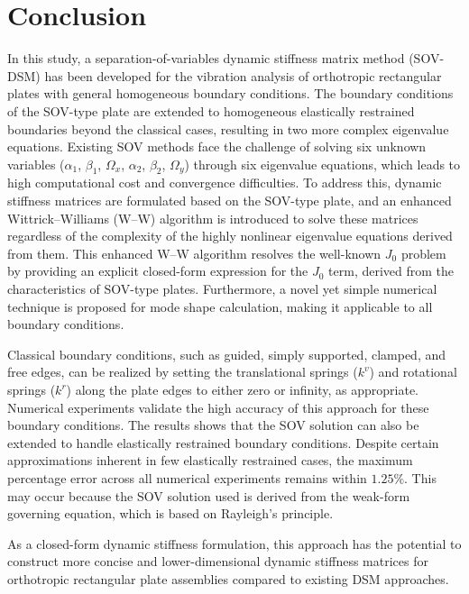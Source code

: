 \documentclass[preprint,12pt,number]{elsarticle}
\begin{document}
\section{Conclusion}\label{sec:coclusion}
In this study, a separation-of-variables dynamic stiffness matrix method (SOV-DSM) has been developed for the vibration analysis of orthotropic rectangular plates with general homogeneous boundary conditions. 
The boundary conditions of the SOV-type plate are extended to homogeneous elastically restrained boundaries beyond the classical cases, resulting in two more complex eigenvalue equations. 
Existing SOV methods face the challenge of solving six unknown variables ($\alpha_1$, $\beta_1$, $\Omega_x$, $\alpha_2$, $\beta_2$, $\Omega_y$) through six eigenvalue equations, which leads to high computational cost and convergence difficulties. 
To address this, dynamic stiffness matrices are formulated based on the SOV-type plate, and an enhanced Wittrick–Williams (W–W) algorithm is introduced to solve these matrices regardless of the complexity of the highly nonlinear eigenvalue equations derived from them. 
This enhanced W–W algorithm resolves the well-known $J_0$ problem by providing an explicit closed-form expression for the $J_0$ term, derived from the characteristics of SOV-type plates. 
Furthermore, a novel yet simple numerical technique is proposed for mode shape calculation, making it applicable to all boundary conditions.

Classical boundary conditions, such as guided, simply supported, clamped, and free edges, can be realized by setting the translational springs ($k^v$) and rotational springs ($k^r$) along the plate edges to either zero or infinity, as appropriate.  
Numerical experiments validate the high accuracy of this approach for these boundary conditions.  
The results shows that the SOV solution can also be extended to handle elastically restrained boundary conditions.
Despite certain approximations inherent in few elastically restrained cases, the maximum percentage error across all numerical experiments remains within $1.25\%$. 
This may occur because the SOV solution used is derived from the weak-form governing equation, which is based on Rayleigh's principle.  

As a closed-form dynamic stiffness formulation, this approach has the potential to construct more concise and lower-dimensional dynamic stiffness matrices for orthotropic rectangular plate assemblies compared to existing DSM approaches.
\end{document}
